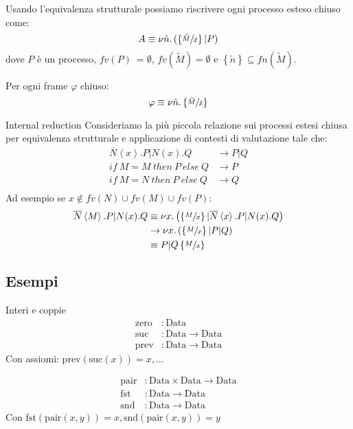 \documentclass{beamer}
\theoremstyle{plain}
\theoremstyle{definition}
\theoremstyle{remark}
\newcommand{\obar}[1]{\overline{#1}}
\newcommand{\set}[1]{\left\{#1\right\}}
\newcommand{\pa}[1]{\left(#1\right)}
\newcommand{\ang}[1]{\left<#1\right>}
\begin{document}
\begin{frame}
  Usando l'equivalenza strutturale possiamo riscrivere ogni processo
  esteso chiuso come:
  \[ A \equiv \nu \tilde n. \pa{ \set{\sfrac{\tilde M}{\tilde x}} | P
    } \]
  dove $P$ \`e un processo, $fv(P)\ = \emptyset$, $fv(\tilde M) =
  \emptyset$ e $\set{\tilde n} \subseteq fn(\tilde M)$.
  \vfill

  Per ogni frame $\varphi$ chiuso:
  \[ \varphi \equiv \nu \tilde n. \set{\sfrac{\tilde M}{\tilde x}} \]
\end{frame}

\begin{frame}{Internal reduction}
  Consideriamo la pi\`u piccola relazione sui processi estesi chiusa
  per equivalenza strutturale e applicazione di contesti di
  valutazione tale che:
  \begin{align*}
    \obar{N}\ang{x}.P|N(x).Q & \rightarrow P|Q \\
    if\ M=M\ then\ P\ else\ Q & \rightarrow P \\
    if\ M=N\ then\ P\ else\ Q & \rightarrow Q \\
  \end{align*}
  \vfill
  \pause 
  Ad esempio se $x \not\in fv(N)\cup fv(M)\cup fv(P)$:
  \begin{align*}
    \obar{N}\ang{M}.P | N(x).Q & \equiv \nu x.\pa{ \set{\sfrac{M}{x}}
                                 | \obar{N} \ang{x}.P | N(x).Q } \\
    & \rightarrow \nu x.\pa{\set{\sfrac{M}{x}}|P|Q} \\
    & \equiv P|Q\set{\sfrac{M}{x}}
  \end{align*}
\end{frame}

\subsection{Esempi}

\begin{frame}{Interi e coppie}
  \begin{align*}
    \mathrm{zero} &: \mathrm{Data} \\
    \mathrm{suc} &: \mathrm{Data} \rightarrow \mathrm{Data} \\
    \mathrm{prev} &: \mathrm{Data} \rightarrow \mathrm{Data}
  \end{align*}
  Con assiomi: \( \mathrm{prev} \pa{ \mathrm{suc} (x) } = x, \dots \)
  \vfill
  
  \begin{align*}
    \mathrm{pair} &: \mathrm{Data} \times \mathrm{Data} \rightarrow
                    \mathrm{Data} \\
    \mathrm{fst} &: \mathrm{Data} \rightarrow \mathrm{Data} \\
    \mathrm{snd} &: \mathrm{Data} \rightarrow \mathrm{Data}
  \end{align*}
  Con $\mathrm{fst}\pa{\mathrm{pair}(x,y)} = x, \mathrm{snd}\pa{\mathrm{pair}(x,y)} = y$ 
\end{frame}
\end{document}
